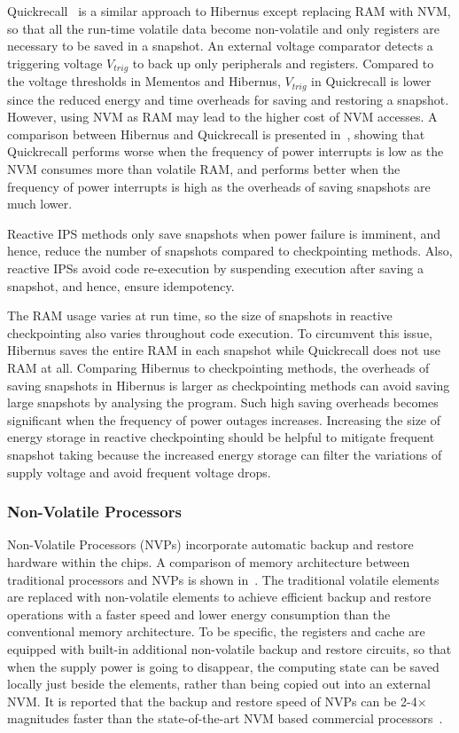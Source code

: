 Quickrecall~\cite{jayakumar2014quickrecall} is a similar approach to Hibernus except replacing RAM with NVM, so that all the run-time volatile data become non-volatile and only registers are necessary to be saved in a snapshot. 
An external voltage comparator detects a triggering voltage $V_{trig}$ to back up only peripherals and registers. 
Compared to the voltage thresholds in Mementos and Hibernus, $V_{trig}$ in Quickrecall is lower since the reduced energy and time overheads for saving and restoring a snapshot. 
However, using NVM as RAM may lead to the higher cost of NVM accesses. 
A comparison between Hibernus and Quickrecall is presented in~\cite{rodriguez2015approaches}, showing that Quickrecall performs worse when the frequency of power interrupts is low as the NVM consumes more than volatile RAM, and performs better when the frequency of power interrupts is high as the overheads of saving snapshots are much lower.

Reactive IPS methods only save snapshots when power failure is imminent, and hence, reduce the number of snapshots compared to checkpointing methods. 
Also, reactive IPSs avoid code re-execution by suspending execution after saving a snapshot, and hence, ensure idempotency. 

The RAM usage varies at run time, so the size of snapshots in reactive checkpointing also varies throughout code execution. 
To circumvent this issue, Hibernus saves the entire RAM in each snapshot while Quickrecall does not use RAM at all. 
Comparing Hibernus to checkpointing methods, the overheads of saving snapshots in Hibernus is larger as checkpointing methods can avoid saving large snapshots by analysing the program. 
Such high saving overheads becomes significant when the frequency of power outages increases. 
Increasing the size of energy storage in reactive checkpointing should be helpful to mitigate frequent snapshot taking because the increased energy storage can filter the variations of supply voltage and avoid frequent voltage drops. 

\subsubsection{Non-Volatile Processors}

Non-Volatile Processors (NVPs) incorporate automatic backup and restore hardware within the chips. 
A comparison of memory architecture between traditional processors and NVPs is shown in~. 
The traditional volatile elements are replaced with non-volatile elements to achieve efficient backup and restore operations with a faster speed and lower energy consumption than the conventional memory architecture. 
To be specific, the registers and cache are equipped with built-in additional non-volatile backup and restore circuits, so that when the supply power is going to disappear, the computing state can be saved locally just beside the elements, rather than being copied out into an external NVM. 
It is reported that the backup and restore speed of NVPs can be 2-4$\times$ magnitudes faster than the state-of-the-art NVM based commercial processors~\cite{liu2015ambient}. 

